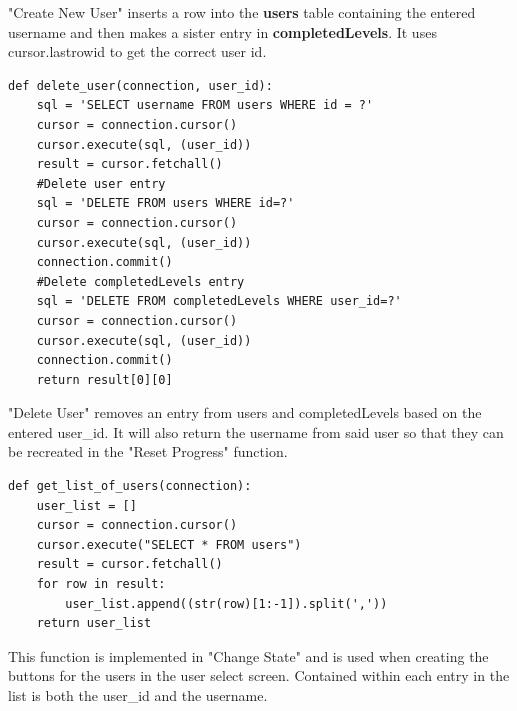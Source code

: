 "Create New User" inserts a row into the \textbf{users} table containing the entered username and then makes a sister entry in \textbf{completedLevels}. It uses
cursor.lastrowid to get the correct user id.
\clearpage
\begin{lstlisting}
def delete_user(connection, user_id):
    sql = 'SELECT username FROM users WHERE id = ?'
    cursor = connection.cursor()
    cursor.execute(sql, (user_id))
    result = cursor.fetchall()
    #Delete user entry
    sql = 'DELETE FROM users WHERE id=?'
    cursor = connection.cursor()
    cursor.execute(sql, (user_id))
    connection.commit()
    #Delete completedLevels entry
    sql = 'DELETE FROM completedLevels WHERE user_id=?'
    cursor = connection.cursor()
    cursor.execute(sql, (user_id))
    connection.commit()
    return result[0][0]
\end{lstlisting}
"Delete User" removes an entry from users and completedLevels based on the entered user\_id. It will also return the username from said user so that they can
be recreated in the "Reset Progress" function.

\begin{lstlisting}
def get_list_of_users(connection):
    user_list = []
    cursor = connection.cursor()
    cursor.execute("SELECT * FROM users")
    result = cursor.fetchall()
    for row in result:
        user_list.append((str(row)[1:-1]).split(','))
    return user_list
\end{lstlisting}
This function is implemented in "Change State" and is used when creating the buttons for the users in the user select screen. Contained within each
entry in the list is both the user\_id and the username.

